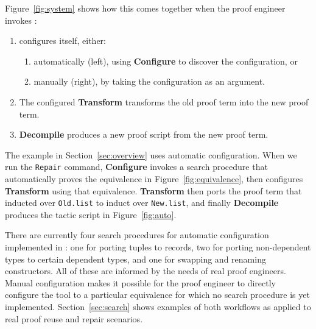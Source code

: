 Figure~\ref{fig:system} shows how this comes together when the proof engineer invokes \toolname:

\begin{enumerate}
\item \toolname configures itself, either:
\begin{enumerate}
\item automatically (left), using \textbf{Configure} to discover the configuration, or
\item manually (right), by taking the configuration as an argument.
\end{enumerate}
\item The configured \textbf{Transform} transforms the old proof term into the new proof term.
\item \textbf{Decompile} produces a new proof script from the new proof term.
\end{enumerate}

The example in Section~\ref{sec:overview} uses automatic configuration. When we run the \lstinline{Repair} command,
\textbf{Configure} invokes a search procedure that automatically proves the equivalence in Figure~\ref{fig:equivalence},
then configures \textbf{Transform} using that equivalence.
\textbf{Transform} then ports the proof term that inducted over \lstinline{Old.list}
to induct over \lstinline{New.list}, and finally
\textbf{Decompile} produces the tactic script in Figure~\ref{fig:auto}.

There are currently four search procedures for automatic configuration implemented in \toolname:
one for porting tuples to records, two for porting non-dependent types to certain dependent types, 
and one for swapping and renaming constructors.
All of these are informed by the needs of real proof engineers.
Manual configuration makes it possible for the proof engineer to directly configure the tool to a particular equivalence
for which no search procedure is yet implemented.
Section~\ref{sec:search} shows examples of both workflows as applied to real proof reuse and repair scenarios.




